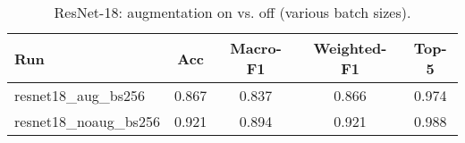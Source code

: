 \begin{table}[h]
  \centering
  \begin{tabular}{lcccc}
    \toprule
    Run & Acc & Macro-F1 & Weighted-F1 & Top-5 \\
    \midrule
    resnet18_aug_bs256 & 0.867 & 0.837 & 0.866 & 0.974 \\
    resnet18_noaug_bs256 & 0.921 & 0.894 & 0.921 & 0.988 \\
    \bottomrule
  \end{tabular}
  \caption{ResNet-18: augmentation on vs. off (various batch sizes).}
  \label{tab:ablation_aug}
\end{table}
